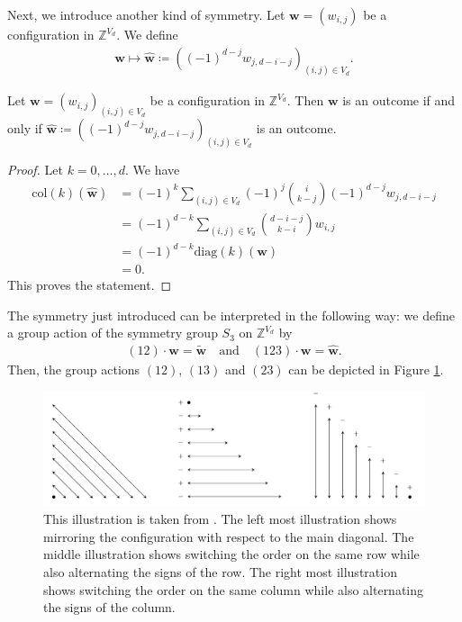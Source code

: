 Next, we introduce another kind of symmetry. Let \( \mathbf{w} = (w_{i,j}) \) be a configuration in \( \mathbb{Z}^{V_d} \). We define 
\begin{align*}
    \mathbf w \mapsto \hat{\mathbf w} \coloneqq \left( (-1)^{d-j} w_{j, d - i -j} \right)_{(i,j) \in V_d}.
\end{align*}

\begin{proposition}\label{prop:symmetry-2}
    Let \( \mathbf{w} = (w_{i,j})_{(i,j) \in V_d} \) be a configuration in \( \mathbb{Z}^{V_d} \). Then \( \mathbf{w} \) is an outcome if and only if \( \hat{\mathbf w} \coloneqq \left( (-1)^{d-j} w_{j, d - i -j} \right)_{(i,j) \in V_d} \) is an outcome.
\end{proposition}

\begin{proof}
    Let \( k = 0, \dots, d \). We have 
    \begin{align*}
        \mathrm{col}(k)(\hat{\mathbf w}) &= (-1)^k \sum_{(i,j) \in V_d}(-1)^j \binom{i}{k-j}(-1)^{d-j}w_{j, d-i-j} \\
        &= (-1)^{d-k} \sum_{(i,j) \in V_d}\binom{d-i-j}{k-i}w_{i, j} \\
        &= (-1)^{d-k} \mathrm{diag}(k)(\mathbf w)\\
        &= 0.
    \end{align*}
    This proves the statement.
\end{proof}

The symmetry just introduced can be interpreted in the following way: we define a group action of the symmetry group \( S_3 \) on \( \mathbb{Z}^{V_d} \) by 
\begin{align*}
    (12) \cdot \mathbf w = \tilde{\mathbf w} \quad \text{and} \quad (123) \cdot \mathbf w = \hat{\mathbf w}.
\end{align*}
Then, the group actions \( (12) \), \( (13) \) and \( (23) \) can be depicted in Figure \ref{fig:group-action-s3}.

\begin{figure}[H]
    \centering
    \includegraphics[width=\textwidth]{assets/group-action-s3.png}
    \caption{This illustration is taken from \cite{bik2022classifying}. The left most illustration shows mirroring the configuration with respect to the main diagonal. The middle illustration shows switching the order on the same row while also alternating the signs of the row. The right most illustration shows switching the order on the same column while also alternating the signs of the column.}
    \label{fig:group-action-s3}
\end{figure}

